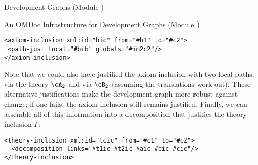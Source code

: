 \begin{omgroup}[id=complex-theories,short=Complex Theories,
                            creators=miko,contributors=frabe]
\begin{omgroup}[id=development-graphs,short=Development Graphs]{Development Graphs (Module
  {})}
\begin{module}[id=dgraph]
\begin{omgroup}[id=dg-omdoc,short=OMDoc Development Graphs]{An OMDoc Infrastructure for
  Development Graphs (Module {})}
\begin{lstlisting}[label=lst:thi-induced-inclusions,index={path-just,axiom-inclusion},
                   caption={The Induced Axiom Inclusions in {\myfigref{thi-proof}}.}]
<axiom-inclusion xml:id="bic" from="#b1" to="#c2">
 <path-just local="#bib" globals="#im2c2"/>
</axiom-inclusion>
\end{lstlisting}
Note that we could also have justified the axiom inclusion {} with
two local paths: via the theory $\cA_2$ and via $\cB_2$ (assuming the translations
work out).  These alternative justifications make the development graph more
robust against change; if one fails, the axiom inclusion still remains justified.
Finally, we can assemble all of this information into a decomposition that
justifies the theory inclusion $\Gamma$:
\begin{lstlisting}[label=lst:thi-proof,index={theory-inclusion,decomposition}
                   caption={Justifying {\element{theory-inclusion}s} via {\element{decompositions}}}]
<theory-inclusion xml:id="tcic" from="#c1" to="#c2">
  <decomposition links="#t1ic #t2ic #aic #bic #cic"/>
</theory-inclusion>
\end{lstlisting}
\end{omgroup}
\end{module}
\end{omgroup}
\end{omgroup}

